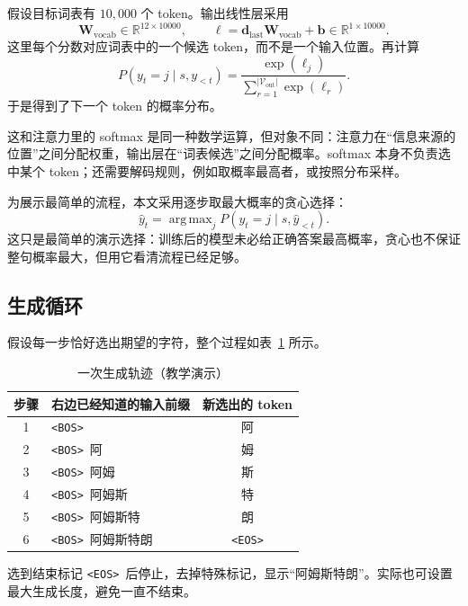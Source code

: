 \documentclass[UTF8,a4paper,12pt]{ctexart}
\numberwithin{equation}{section}
\DeclareMathOperator*{\argmax}{arg\,max}
\newcommand{\R}{\mathbb{R}}
\newcommand{\bos}{\texttt{<BOS>}}
\newcommand{\eos}{\texttt{<EOS>}}
\begin{document}
假设目标词表有 $10{,}000$ 个 token。输出线性层采用
\begin{equation}
\bm W_{\mathrm{vocab}}\in\R^{12\times10000},\qquad
\bm\ell=\bm d_{\mathrm{last}}\bm W_{\mathrm{vocab}}+\bm b
\in\R^{1\times10000}.
\label{eq:vocablinear}
\end{equation}
这里每个分数对应词表中的一个候选 token，而不是一个输入位置。再计算
\begin{equation}
P(y_t=j\mid s,y_{<t})=
\frac{\exp(\ell_j)}{\sum_{r=1}^{|\mathcal V_{\mathrm{out}}|}\exp(\ell_r)}.
\label{eq:vocabsoftmax}
\end{equation}
于是得到了下一个 token 的概率分布。

这和注意力里的 softmax 是同一种数学运算，但对象不同：注意力在``信息来源的位置''之间分配权重，输出层在``词表候选''之间分配概率。softmax 本身不负责选中某个 token；还需要解码规则，例如取概率最高者，或按照分布采样。

为展示最简单的流程，本文采用逐步取最大概率的贪心选择：
\[
\hat y_t=\argmax_j P(y_t=j\mid s,\hat y_{<t}).
\]
这只是最简单的演示选择：训练后的模型未必给正确答案最高概率，贪心也不保证整句概率最大，但用它看清流程已经足够。

\subsection{生成循环}

假设每一步恰好选出期望的字符，整个过程如表~\ref{tab:generation} 所示。
\begin{table}[htbp]
\centering
\caption{一次生成轨迹（教学演示）}
\label{tab:generation}
\renewcommand{\arraystretch}{1.2}
\begin{tabular}{clc}
\toprule
步骤 & 右边已经知道的输入前缀 & 新选出的 token\\
\midrule
1 & \bos & 阿\\
2 & \bos\ 阿 & 姆\\
3 & \bos\ 阿姆 & 斯\\
4 & \bos\ 阿姆斯 & 特\\
5 & \bos\ 阿姆斯特 & 朗\\
6 & \bos\ 阿姆斯特朗 & \eos\\
\bottomrule
\end{tabular}
\end{table}

选到结束标记 \eos\ 后停止，去掉特殊标记，显示``阿姆斯特朗''。实际也可设置最大生成长度，避免一直不结束。
\end{document}

